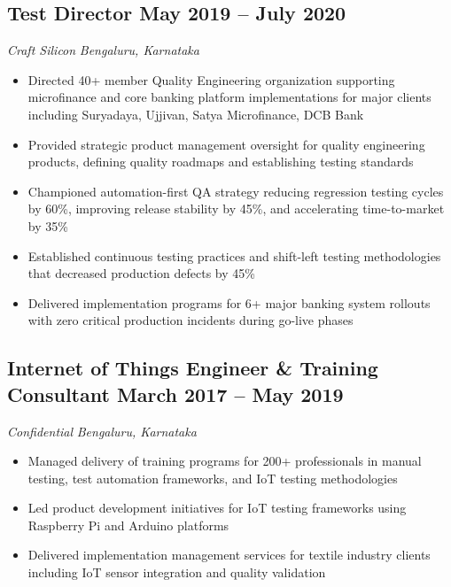 \documentclass[11pt,a4paper]{article}
\begin{document}
\subsection*{Test Director \hfill \normalfont May 2019 -- July 2020}
\textit{Craft Silicon} \hfill \textit{Bengaluru, Karnataka}
\begin{itemize}[leftmargin=*, itemsep=2pt]
    \item Directed 40+ member Quality Engineering organization supporting microfinance and core banking platform implementations for major clients including Suryadaya, Ujjivan, Satya Microfinance, DCB Bank
    \item Provided strategic product management oversight for quality engineering products, defining quality roadmaps and establishing testing standards
    \item Championed automation-first QA strategy reducing regression testing cycles by 60\%, improving release stability by 45\%, and accelerating time-to-market by 35\%
    \item Established continuous testing practices and shift-left testing methodologies that decreased production defects by 45\%
    \item Delivered implementation programs for 6+ major banking system rollouts with zero critical production incidents during go-live phases
\end{itemize}

\subsection*{Internet of Things Engineer \& Training Consultant \hfill \normalfont March 2017 -- May 2019}
\textit{Confidential} \hfill \textit{Bengaluru, Karnataka}
\begin{itemize}[leftmargin=*, itemsep=2pt]
    \item Managed delivery of training programs for 200+ professionals in manual testing, test automation frameworks, and IoT testing methodologies
    \item Led product development initiatives for IoT testing frameworks using Raspberry Pi and Arduino platforms
    \item Delivered implementation management services for textile industry clients including IoT sensor integration and quality validation
\end{itemize}
\end{document}
